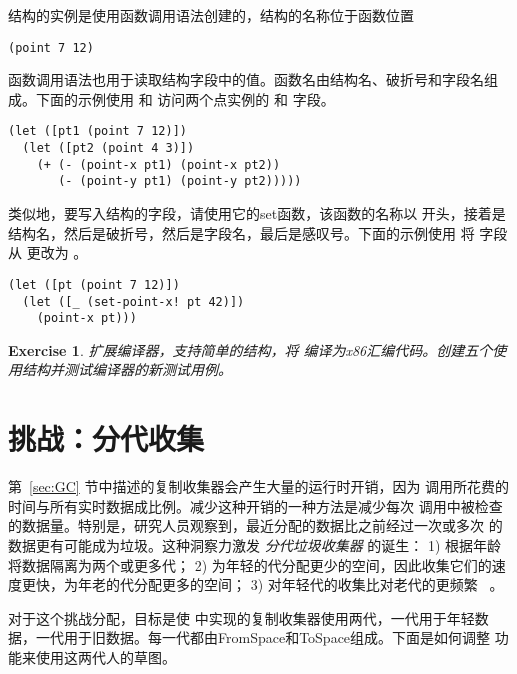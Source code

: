 \documentclass[11pt]{book}
\newtheorem{exercise}[theorem]{Exercise}
\begin{document}
结构的实例是使用函数调用语法创建的，结构的名称位于函数位置
\begin{lstlisting}
(point 7 12)
\end{lstlisting}
函数调用语法也用于读取结构字段中的值。函数名由结构名、破折号和字段名组成。下面的示例使用  和
 访问两个点实例的  和  字段。
\begin{center}
\begin{lstlisting}
(let ([pt1 (point 7 12)])
  (let ([pt2 (point 4 3)])
    (+ (- (point-x pt1) (point-x pt2))
       (- (point-y pt1) (point-y pt2)))))
\end{lstlisting}
\end{center}
类似地，要写入结构的字段，请使用它的set函数，该函数的名称以  开头，接着是结构名，然后是破折号，然后是字段名，最后是感叹号。下面的示例使用  将
 字段从  更改为  。
\begin{center}
  \begin{lstlisting}
(let ([pt (point 7 12)])
  (let ([_ (set-point-x! pt 42)])
    (point-x pt)))
\end{lstlisting}
\end{center}

\begin{exercise}\normalfont
  扩展编译器，支持简单的结构，将 \LangStruct{} 编译为x86汇编代码。创建五个使用结构并测试编译器的新测试用例。
\end{exercise}


\section{挑战：分代收集}

第~\ref{sec:GC} 节中描述的复制收集器会产生大量的运行时开销，因为  调用所花费的时间与所有实时数据成比例。减少这种开销的一种方法是减少每次
 调用中被检查的数据量。特别是，研究人员观察到，最近分配的数据比之前经过一次或多次  的数据更有可能成为垃圾。这种洞察力激发 \emph{分代垃圾收集器}
 的诞生：
1) 根据年龄将数据隔离为两个或更多代；
2) 为年轻的代分配更少的空间，因此收集它们的速度更快，为年老的代分配更多的空间； 3) 对年轻代的收集比对老代的更频繁~\citep{Wilson:1992fk} 。

对于这个挑战分配，目标是使  中实现的复制收集器使用两代，一代用于年轻数据，一代用于旧数据。每一代都由FromSpace和ToSpace组成。下面是如何调整
 功能来使用这两代人的草图。
\end{document}
